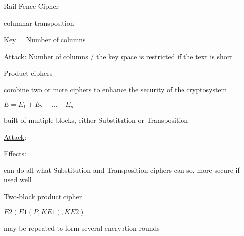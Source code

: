 \documentclass[landscape, a4paper]{article}
\begin{document}
\begin{minipage}[t]{0.19\pagewidth}
\begin{betterlist}
\begin{betterlist}
\begin{betterlist}
			\end{betterlist}
		\end{betterlist}
		\begin{betterlist}
			\item \alert{Rail-Fence Cipher}
			\begin{betterlist}
				\item columnar transposition
				\item Key = Number of columns
				\item \underline{Attack:} Number of columns / the  key space is restricted if the text is short
			\end{betterlist}
		\end{betterlist}
	\end{betterlist}
	\begin{betterlist}
		\item \alert{Product ciphers}
		\begin{betterlist}
			\item combine two or more ciphers to enhance the security of the cryptosystem
			\begin{betterlist}
				\item $E = E_1 + E_2 + ... + E_n$
				\item built of multiple blocks, either \alert{Substitution} or \alert{Transposition}
			\end{betterlist}
			\item \underline{Attack}:
			\item \underline{Effects:}
			\begin{betterlist}
				\item can do all what Substitution and Transposition ciphers can so, more secure if used well
			\end{betterlist}
		\end{betterlist}
		\begin{betterlist}
			\item \alert{Two-block product cipher}
			\begin{betterlist}
				\item $E2(E1(P, KE1), KE2)$
				\item may be repeated to form several encryption rounds
			\end{betterlist}
		\end{betterlist}
	\end{betterlist}

\end{minipage}
\end{document}
